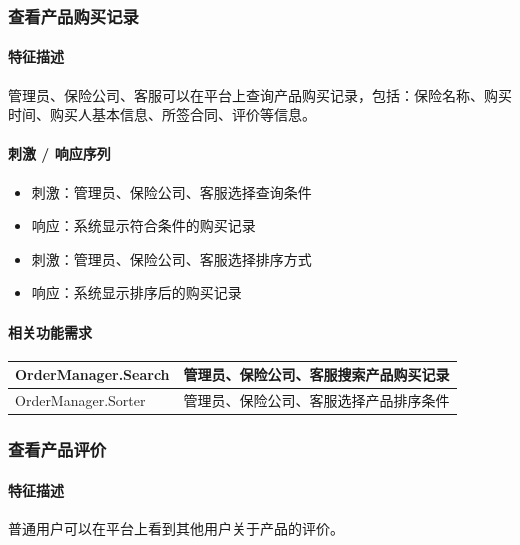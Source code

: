 \documentclass[a4paper]{ctexart}
\begin{document}
\subsubsection{查看产品购买记录}

\paragraph{特征描述}

管理员、保险公司、客服可以在平台上查询产品购买记录，包括：保险名称、购买时间、购买人基本信息、所签合同、评价等信息。

\paragraph{刺激 / 响应序列}

\begin{itemize}
    \item 刺激：管理员、保险公司、客服选择查询条件
    \item 响应：系统显示符合条件的购买记录
    \item 刺激：管理员、保险公司、客服选择排序方式
    \item 响应：系统显示排序后的购买记录
\end{itemize}

\paragraph{相关功能需求}

\begin{center}
  \begin{tabular}{p{6cm}|p{8cm}}
    \toprule
    OrderManager.Search        & 管理员、保险公司、客服搜索产品购买记录 \\
    \midrule
    OrderManager.Sorter       & 管理员、保险公司、客服选择产品排序条件 \\
    \bottomrule
  \end{tabular}
\end{center}

\subsubsection{查看产品评价}

\paragraph{特征描述}

普通用户可以在平台上看到其他用户关于产品的评价。
\end{document}
